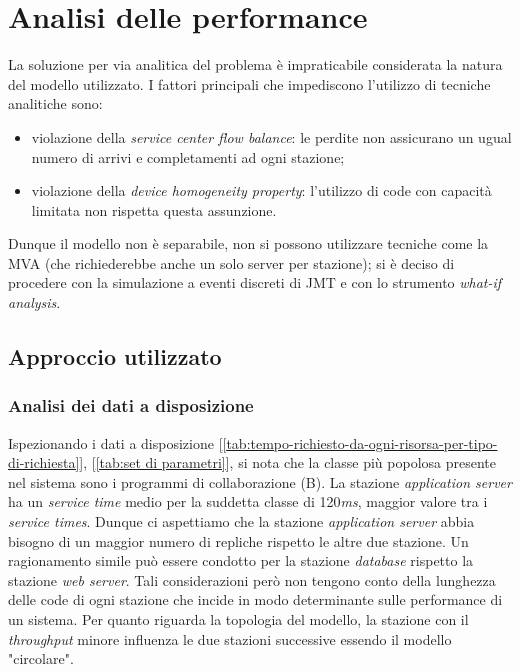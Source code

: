 \documentclass[../main.tex]{subfiles}
\begin{document}
    \chapter{Analisi delle performance}\label{ch:analisi-delle-performance}

    La soluzione per via analitica del problema è impraticabile considerata la natura del
    modello utilizzato. I fattori principali che impediscono l’utilizzo di tecniche analitiche
    sono:
    \begin{itemize}
        \item violazione della \textit{service center flow balance}: le perdite non assicurano un ugual numero di arrivi
      e completamenti ad ogni stazione;
        \item violazione della \textit{device homogeneity property}: l'utilizzo di code con capacità limitata non
        rispetta questa assunzione.
    \end{itemize}
    Dunque il modello non è separabile, non si possono utilizzare tecniche come la MVA (che
    richiederebbe anche un solo server per stazione); si è deciso di procedere
    con la simulazione a eventi discreti di JMT e con lo strumento \textit{what-if analysis}.


    \section{Approccio utilizzato}\label{sec:approccio-utilizzato}

    \subsection{Analisi dei dati a disposizione}\label{subsec:analisi-dei-dati-a-disposizione}
    Ispezionando i dati a disposizione [\ref{tab:tempo-richiesto-da-ogni-risorsa-per-tipo-di-richiesta}],
    [\ref{tab:set di parametri}], si nota che la classe più popolosa presente nel sistema sono i programmi di
    collaborazione (B). La stazione \textit{application server} ha un \textit{service time} medio per la suddetta classe
    di 120\textit{ms}, maggior valore tra i \textit{service times}.
    Dunque ci aspettiamo che la stazione \textit{application server} abbia bisogno di un maggior numero di repliche
    rispetto le altre due stazione.
    Un ragionamento simile può essere condotto per la stazione \textit{database} rispetto la stazione
    \textit{web server}.
    Tali considerazioni però non tengono conto della lunghezza delle code di ogni stazione che incide in modo
    determinante sulle performance di un sistema.
    Per quanto riguarda la topologia del modello, la stazione con il \textit{throughput} minore influenza le
     due stazioni successive essendo il modello "circolare".
\end{document}
